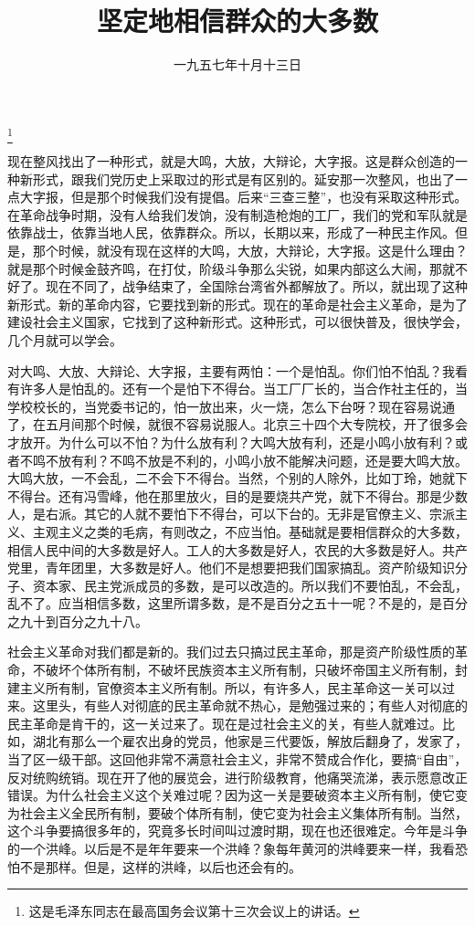 
\title{坚定地相信群众的大多数}
\date{一九五七年十月十三日}
\thanks{这是毛泽东同志在最高国务会议第十三次会议上的讲话。}
\maketitle


现在整风找出了一种形式，就是大鸣，大放，大辩论，大字报。这是群众创造的一种新形式，跟我们党历史上采取过的形式是有区别的。延安那一次整风，也出了一点大字报，但是那个时候我们没有提倡。后来“三查三整”，也没有采取这种形式。在革命战争时期，没有人给我们发饷，没有制造枪炮的工厂，我们的党和军队就是依靠战士，依靠当地人民，依靠群众。所以，长期以来，形成了一种民主作风。但是，那个时候，就没有现在这样的大鸣，大放，大辩论，大字报。这是什么理由？就是那个时候金鼓齐鸣，在打仗，阶级斗争那么尖锐，如果内部这么大闹，那就不好了。现在不同了，战争结束了，全国除台湾省外都解放了。所以，就出现了这种新形式。新的革命内容，它要找到新的形式。现在的革命是社会主义革命，是为了建设社会主义国家，它找到了这种新形式。这种形式，可以很快普及，很快学会，几个月就可以学会。

对大鸣、大放、大辩论、大字报，主要有两怕：一个是怕乱。你们怕不怕乱？我看有许多人是怕乱的。还有一个是怕下不得台。当工厂厂长的，当合作社主任的，当学校校长的，当党委书记的，怕一放出来，火一烧，怎么下台呀？现在容易说通了，在五月间那个时候，就很不容易说服人。北京三十四个大专院校，开了很多会才放开。为什么可以不怕？为什么放有利？大鸣大放有利，还是小鸣小放有利？或者不鸣不放有利？不鸣不放是不利的，小鸣小放不能解决问题，还是要大鸣大放。大鸣大放，一不会乱，二不会下不得台。当然，个别的人除外，比如丁玲，她就下不得台。还有冯雪峰，他在那里放火，目的是要烧共产党，就下不得台。那是少数人，是右派。其它的人就不要怕下不得台，可以下台的。无非是官僚主义、宗派主义、主观主义之类的毛病，有则改之，不应当怕。基础就是要相信群众的大多数，相信人民中间的大多数是好人。工人的大多数是好人，农民的大多数是好人。共产党里，青年团里，大多数是好人。他们不是想要把我们国家搞乱。资产阶级知识分子、资本家、民主党派成员的多数，是可以改造的。所以我们不要怕乱，不会乱，乱不了。应当相信多数，这里所谓多数，是不是百分之五十一呢？不是的，是百分之九十到百分之九十八。

社会主义革命对我们都是新的。我们过去只搞过民主革命，那是资产阶级性质的革命，不破坏个体所有制，不破坏民族资本主义所有制，只破坏帝国主义所有制，封建主义所有制，官僚资本主义所有制。所以，有许多人，民主革命这一关可以过来。这里头，有些人对彻底的民主革命就不热心，是勉强过来的；有些人对彻底的民主革命是肯干的，这一关过来了。现在是过社会主义的关，有些人就难过。比如，湖北有那么一个雇农出身的党员，他家是三代要饭，解放后翻身了，发家了，当了区一级干部。这回他非常不满意社会主义，非常不赞成合作化，要搞“自由”，反对统购统销。现在开了他的展览会，进行阶级教育，他痛哭流涕，表示愿意改正错误。为什么社会主义这个关难过呢？因为这一关是要破资本主义所有制，使它变为社会主义全民所有制，要破个体所有制，使它变为社会主义集体所有制。当然，这个斗争要搞很多年的，究竟多长时间叫过渡时期，现在也还很难定。今年是斗争的一个洪峰。以后是不是年年要来一个洪峰？象每年黄河的洪峰要来一样，我看恐怕不是那样。但是，这样的洪峰，以后也还会有的。

